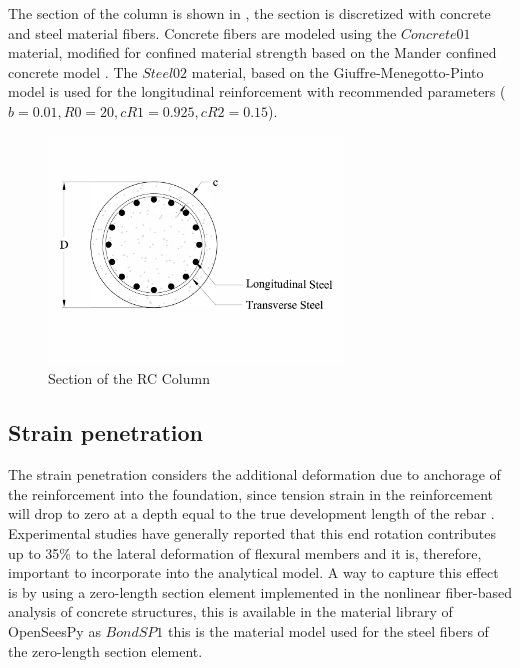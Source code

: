 The section of the column is shown in , the section is discretized with concrete and steel material fibers. Concrete fibers are modeled using the $Concrete01$ material, modified for confined material strength based on the Mander confined concrete model \cite{Mander1988}. The $Steel02$ material, based on the Giuffre-Menegotto-Pinto model \cite{Filippou1983} is used for the longitudinal reinforcement with recommended parameters ($b = 0.01, R0 = 20, cR1 = 0.925, cR2 = 0.15$). 

\begin{figure}[htbp]
	\centering
	\includegraphics[width=0.7\textwidth]{Chapter-4/figs/StructuralModel_Section}
	\caption{Section of the RC Column}
	\label{fig:ColumnSection}
\end{figure}
\subsection{Strain penetration}

The strain penetration considers the additional deformation due to anchorage of the reinforcement into the foundation, since tension strain in the reinforcement will drop to zero at a depth equal to the true development length of the rebar \cite{Priestley2007}. Experimental studies have generally reported that this end rotation contributes up to 35\% to the lateral deformation of flexural members\cite{Zhao2007} and it is, therefore, important to incorporate into the analytical model. A way to capture this effect is by using a zero-length section element implemented in the nonlinear fiber-based analysis of concrete structures, this is available in the material library of OpenSeesPy as $Bond SP1$ \cite{Zhao2007} this is the material model used for the steel fibers of the zero-length section element.


